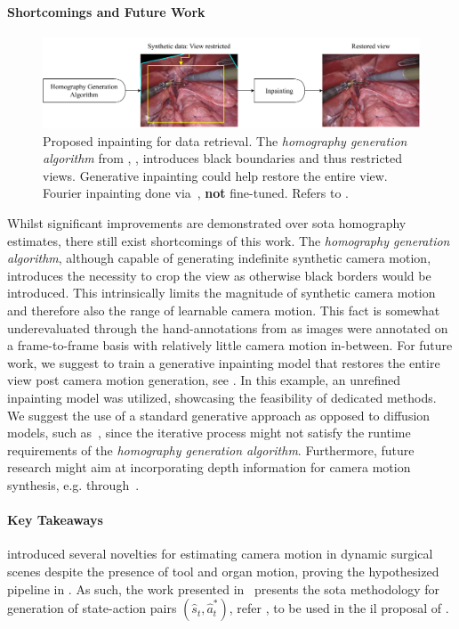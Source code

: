 \paragraph{Shortcomings and Future Work}
\begin{figure}[tb]
    \centering
    \includegraphics[width=\textwidth]{conclusion/fig/fourier_inpainting.pdf}
    \caption{Proposed inpainting for data retrieval. The \textit{homography generation algorithm} from , , introduces black boundaries and thus restricted views. Generative inpainting could help restore the entire view. Fourier inpainting done via~\cite{suvorov2021resolution}, \textbf{not} fine-tuned. Refers to .}
    \label{con:fig:inpainting}
\end{figure}
Whilst significant improvements are demonstrated over \gls{sota} homography estimates, there still exist shortcomings of this work. The \textit{homography generation algorithm}, although capable of generating indefinite synthetic camera motion, introduces the necessity to crop the view as otherwise black borders would be introduced. This intrinsically limits the magnitude of synthetic camera motion and therefore also the range of learnable camera motion. This fact is somewhat underevaluated through the hand-annotations from  as images were annotated on a frame-to-frame basis with relatively little camera motion in-between. For future work, we suggest to train a generative inpainting model that restores the entire view post camera motion generation, see . In this example, an unrefined inpainting model was utilized, showcasing the feasibility of dedicated methods. We suggest the use of a standard generative approach as opposed to diffusion models, such as~\cite{rombach2022high}, since the iterative process might not satisfy the runtime requirements of the \textit{homography generation algorithm}. Furthermore, future research might aim at incorporating depth information for camera motion synthesis, e.g. through~\cite{budd2024transferring}.

\paragraph{Key Takeaways}  introduced several novelties for estimating camera motion in dynamic surgical scenes despite the presence of tool and organ motion, proving the hypothesized pipeline in . As such, the work presented in~\cite{huber2022deep} presents the \gls{sota} methodology for generation of state-action pairs $(\hat{s}_t, \hat{a}^*_t)$, refer , to be used in the \gls{il} proposal of .

